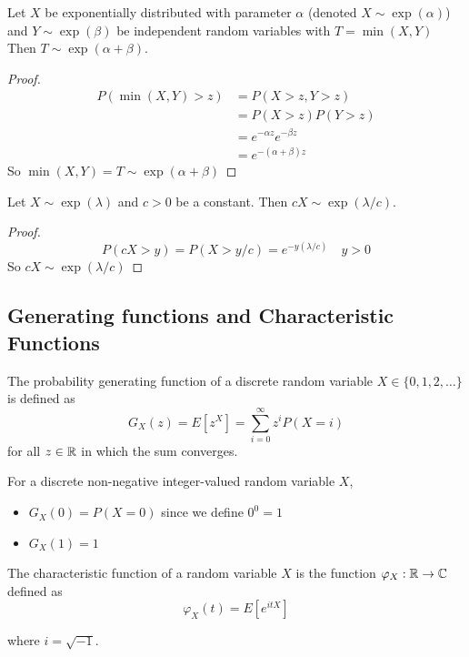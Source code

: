 \begin{theorem}\label{thm:exp_t_cond}
Let $X$ be exponentially distributed with parameter $\alpha$ (denoted $X \sim \exp(\alpha)$) and $Y \sim \exp(\beta)$ be independent random variables with $T = \min(X,Y)$
Then $T \sim \exp(\alpha + \beta)$.
\end{theorem}

\begin{proof}
\begin{align*}
    P(\min(X,Y) > z) &= P(X > z, Y > z)\\
    &= P(X > z) P(Y > z)\\
    &= e^{-\alpha z} e^{-\beta z}\\
    &= e^{-(\alpha + \beta) z}
\end{align*}
So $\min(X,Y) = T \sim \exp(\alpha + \beta)$
\end{proof}

\begin{theorem} \label{thm:exp_scaling}
Let $X \sim \exp(\lambda)$ and $c > 0$ be a constant.
Then $cX \sim \exp(\lambda/c)$.
\end{theorem}

\begin{proof}
$$
    P(cX > y) = P(X > y/c) = e^{-y (\lambda/c)} \quad y > 0
$$
So $cX \sim \exp(\lambda/c)$
\end{proof}

\subsection{Generating functions and Characteristic Functions}

\begin{defn}
The probability generating function of a discrete random variable $X \in \{0,1,2, \ldots\}$ is defined as
$$
G_X(z) = E[z^X] = \sum_{i = 0}^\infty z^i P(X = i)
$$
for all $z \in \mathbb{R}$ in which the sum converges.
\end{defn}

\begin{note}
For a discrete non-negative integer-valued random variable $X$,
\begin{itemize}
    \item $G_X(0) = P(X = 0)$ since we define $0^0 = 1$
    \item $G_X(1) = 1$
\end{itemize}
\end{note}

\begin{defn}
The characteristic function of a random variable $X$ is the function $\varphi_X : \mathbb{R} \to \mathbb C$ defined as
$$
\varphi_X(t) = E[e^{itX}]
$$

where $i = \sqrt{-1}$.
\end{defn}

